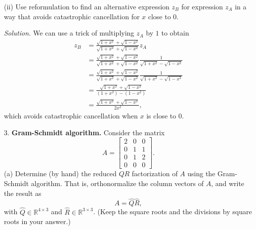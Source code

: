 \documentclass{article}
\newcommand{\R}{\mathbb{R}}
\begin{document}
\vspace{5mm}

(ii) Use reformulation to find an alternative expression $z_B$ for expression
$z_A$ in a way that avoids catastrophic cancellation for $x$ close to $0$.

\textit{Solution.}
We can use a trick of multiplying $z_A$ by $1$ to obtain
%
\begin{align*}
    z_B &=
        \frac{\sqrt{1 + x^2} + \sqrt{1 - x^2}}{\sqrt{1 + x^2} + \sqrt{1 - x^2}}
        z_A \\
        &=
        \frac{\sqrt{1 + x^2} + \sqrt{1 - x^2}}{\sqrt{1 + x^2} + \sqrt{1 - x^2}}
        \frac{1}{\sqrt{1 + x^2} - \sqrt{1 - x^2}}
        \\
        &=
        \frac{\sqrt{1 + x^2} + \sqrt{1 - x^2}}{\sqrt{1 + x^2} + \sqrt{1 - x^2}}
        \frac{1}{\sqrt{1 + x^2} - \sqrt{1 - x^2}}
        \\
        &=
        \frac{\sqrt{1 + x^2} + \sqrt{1 - x^2}}{(1 + x^2) - (1 - x^2)}
        \\
        &=
        \frac{\sqrt{1 + x^2} + \sqrt{1 - x^2}}{2 x^2}
        ,
\end{align*}
%
which avoids catastrophic cancellation when $x$ is close to $0$.

\newpage

3. \textbf{Gram-Schmidt algorithm.}
Consider the matrix
%
\begin{equation*}
    A =
    \begin{bmatrix}
        2 & 0 & 0 \\
        0 & 1 & 1 \\
        0 & 1 & 2 \\
        0 & 0 & 0
    \end{bmatrix}
    .
\end{equation*}
%
(a) Determine (by hand) the reduced $QR$ factorization of $A$ using the
Gram-Schmidt algorithm. That is, orthonormalize the column vectors of $A$,
and write the result as
%
\begin{equation*}
    A = \widehat{Q} \widehat{R},
\end{equation*}
%
with $\widehat{Q} \in \R^{4 \times 3}$ and $\widehat{R} \in \R^{3 \times 3}$. (Keep
the square roots and the divisions by square roots in your answer.)
\end{document}

